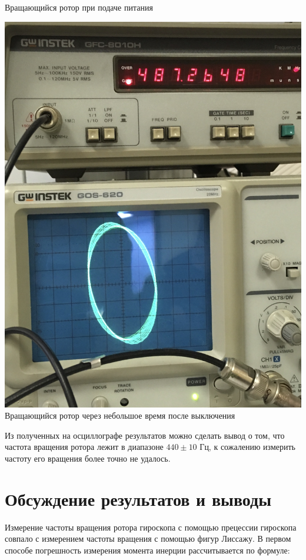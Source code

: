 \documentclass{article}
\begin{document}
\begin{center}
\begin{center}
\begin{minipage}{0.4\textwidth}
\begin{center}
  Вращающийся ротор при подаче питания\\
 \end{center}
\end{minipage}
\begin{minipage}{0.4\textwidth}
\begin{center}
  \includegraphics[width=0.8\linewidth]{IMG_6.jpg}\\
 
  Вращающийся ротор через небольшое время после выключения\\
 \end{center}
\end{minipage} 
  \end{center}

Из полученных на осциллографе результатов можно сделать вывод о том, что частота вращения ротора лежит в диапазоне $440 \pm 10$ Гц, к сожалению измерить частоту его вращения более точно не удалось. 

\section{Обсуждение результатов и выводы}
Измерение частоты вращения ротора гироскопа с помощью прецессии гироскопа совпало с измерением частоты вращения с помощью фигур Лиссажу. В первом способе погрешность измерения момента инерции рассчитывается по формуле:


\end{center}
\end{document}
